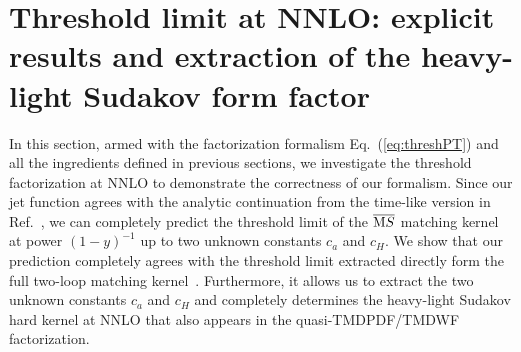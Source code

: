 \documentclass[a4paper,11pt]{article}
\begin{document}
\section{Threshold limit at NNLO: explicit results and extraction of the heavy-light Sudakov form factor}\label{sec:NNLO}
In this section, armed with the factorization formalism Eq.~(\ref{eq:threshPT}) and all the ingredients defined in previous sections, we investigate the threshold factorization at NNLO to demonstrate the correctness of our formalism.  Since our jet function agrees with the analytic continuation from the time-like version in Ref.~\cite{Jain:2008gb}, we can completely predict the threshold limit of the $\overline {\text MS}$ matching kernel at power $(1-y)^{-1}$ up to two unknown constants $c_a$ and $c_H$. We show that our prediction completely agrees with the threshold limit extracted directly form the full two-loop matching kernel~\cite{Li:2020xml,Chen:2020ody}. Furthermore, it allows us to extract the two unknown constants $c_a$ and $c_H$ and completely determines the heavy-light Sudakov hard kernel at NNLO that also appears in the quasi-TMDPDF/TMDWF factorization. 
\end{document}
